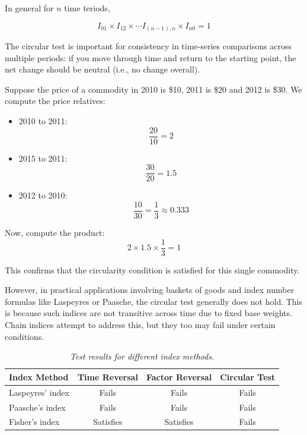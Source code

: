 \documentclass[twoside]{book}
\begin{document}
In general for $n$ time teriods,

\begin{textbox}
\[
   I_{01} \times I_{12} \times \cdots I_{(n-1),n} \times I_{n0} = 1
\]
\end{textbox}

The circular test is important for consistency in time-series comparisons across multiple periods: if you move through time and return to the starting point, the net change should be neutral (i.e., no change overall).


Suppose the price of a commodity in 2010 is \$10, 2011 is \$20 and 2012 is \$30. We compute the price relatives:

\begin{itemize}
  \item {2010 to 2011:}
  \[
  \dfrac{20}{10} = 2
  \]

  \item {2015 to 2011:}
  \[
  \dfrac{30}{20} = 1.5
  \]

  \item {2012 to 2010:}
  \[
  \dfrac{10}{30} = \dfrac{1}{3} \approx 0.333
  \]
\end{itemize}

\noindent
Now, compute the product:
\[
2 \times 1.5 \times \dfrac{1}{3} = 1
\]

This confirms that the circularity condition is satisfied for this single commodity.

\noindent
However, in practical applications involving baskets of goods and index number formulas like Laspeyres or Paasche, the circular test generally does not hold. This is because such indices are not transitive across time due to fixed base weights. Chain indices attempt to address this, but they too may fail under certain conditions.

\begin{table}[H]
\centering
\begin{tabular}{l|c|c|c}
\toprule
\textbf{Index Method} & \textbf{Time Reversal} & \textbf{Factor Reversal} & \textbf{Circular Test} \\
\midrule
Laspeyres' index & Fails & Fails & Fails \\
Paasche's index & Fails & Fails & Fails \\
Fisher's index & Satisfies & Satisfies & Fails \\
\bottomrule
\end{tabular}
\caption{\textit{Test results for different index methods.}}
\end{table}
\end{document}
